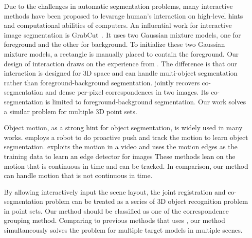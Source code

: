 %
Due to the challenges in automatic segmentation problems, many interactive methods have been proposed to levarage human's interaction on high-level hints and computational abilities of computers.
An influential work for interactive image segmentation is GrabCut~\cite{grabcut}. 
It uses two Gaussian mixture models, one for foreground and the other for background. 
To initialize these two Gaussian mixture models, a rectangle is manually placed to contain the foreground. 
Our design of interaction draws on the experience from \cite{grabcut}. 
%
The difference is that our interaction is designed for 3D space and can handle multi-object segmentation rather than foreground-background segmentation. 
%
\cite{Taniai_2016_CVPR} jointly recovers co-segmentation and dense per-pixel correspondences in two images. 
Its co-segmentation is limited to foreground-background segmentation. Our work solves a similar problem for multiple 3D point sets. 

Object motion, as a strong hint for object segmentation, is widely used in many works.
\cite{Xu:2015:ACS:2816795.2818075} employs a robot to do proactive push and track the motion to learn object segmentation. 
\cite{unsupervisededge} exploits the motion in a video and uses the motion edges as the training data to learn an edge detector for images
These methods lean on the motion that is continuous in time and can be tracked. 
In comparison, our method can handle motion that is not continuous in time.

By allowing interactively input the scene layout, the joint registration and co-segmentation problem can be treated as a series of 3D object recognition problem in point sets. 
%
Our method should be classified as one of the correspondence grouping method. 
Comparing to previous methods that uses \cite{hough,LOF}, our method simultaneously solves the problem for multiple target models in multiple scenes.
